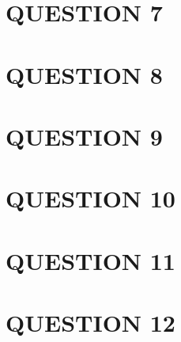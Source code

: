 \documentclass[a4paper]{article}
\begin{document}
\section{QUESTION 7}
\section{QUESTION 8}
\section{QUESTION 9}
\section{QUESTION 10}
\section{QUESTION 11}
\section{QUESTION 12}
\end{document}
